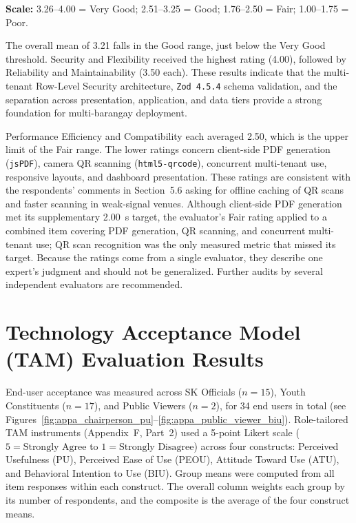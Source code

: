 \noindent\textbf{Scale:} 3.26--4.00 = Very Good; 2.51--3.25 = Good; 1.76--2.50 = Fair; 1.00--1.75 = Poor.
\vspace{5mm}

\hspace*{\parindent}The overall mean of 3.21 falls in the Good range, just below the Very Good threshold. Security and Flexibility received the highest rating (4.00), followed by Reliability and Maintainability (3.50 each). These results indicate that the multi-tenant Row-Level Security architecture, \texttt{Zod 4.5.4} schema validation, and the separation across presentation, application, and data tiers provide a strong foundation for multi-barangay deployment.
\vspace{5mm}

\hspace*{\parindent}Performance Efficiency and Compatibility each averaged 2.50, which is the upper limit of the Fair range. The lower ratings concern client-side PDF generation (\texttt{jsPDF}), camera QR scanning (\texttt{html5-qrcode}), concurrent multi-tenant use, responsive layouts, and dashboard presentation. These ratings are consistent with the respondents' comments in Section~5.6 asking for offline caching of QR scans and faster scanning in weak-signal venues. Although client-side PDF generation met its supplementary 2.00~s target, the evaluator's Fair rating applied to a combined item covering PDF generation, QR scanning, and concurrent multi-tenant use; QR scan recognition was the only measured metric that missed its target. Because the ratings come from a single evaluator, they describe one expert's judgment and should not be generalized. Further audits by several independent evaluators are recommended.
\vspace{5mm}

\section{Technology Acceptance Model (TAM) Evaluation Results}
\label{sec:technology_acceptance_model_evaluation_results}

\hspace*{\parindent}End-user acceptance was measured across SK Officials ($n = 15$), Youth Constituents ($n = 17$), and Public Viewers ($n = 2$), for 34 end users in total (see Figures~\ref{fig:appa_chairperson_pu}--\ref{fig:appa_public_viewer_biu}). Role-tailored TAM instruments (Appendix~F, Part~2) used a 5-point Likert scale ($5 = \text{Strongly Agree}$ to $1 = \text{Strongly Disagree}$) across four constructs: Perceived Usefulness (PU), Perceived Ease of Use (PEOU), Attitude Toward Use (ATU), and Behavioral Intention to Use (BIU). Group means were computed from all item responses within each construct. The overall column weights each group by its number of respondents, and the composite is the average of the four construct means.
\vspace{5mm}


